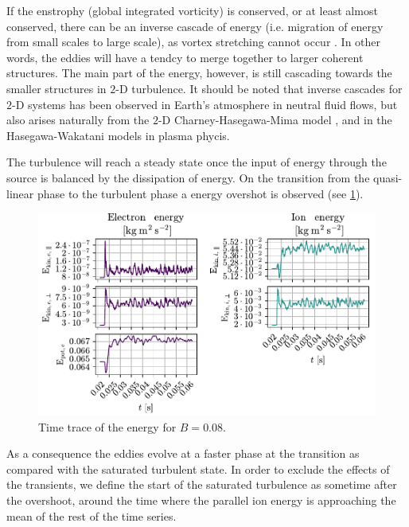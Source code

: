 If the enstrophy (global integrated vorticity) is conserved, or at least almost conserved, there can be an inverse cascade of energy (i.e. migration of energy from small scales to large scale), as vortex stretching cannot occur \cite{Fjortoft1953}.
In other words, the eddies will have a tendcy to merge together to larger coherent structures.
The main part of the energy, however, is still cascading towards the smaller structures in $2$-D turbulence.
It should be noted that inverse cascades for $2$-D systems has been observed in Earth's atmosphere \cite{Smith2002} in neutral fluid flows, but also arises naturally from the $2$-D Charney-Hasegawa-Mima model \cite{Boffetta2002}, and in the Hasegawa-Wakatani \cite{Manz2009} models in plasma phycis.

The turbulence will reach a steady state once the input of energy through the source is balanced by the dissipation of energy.
On the transition from the quasi-linear phase to the turbulent phase a energy overshot is observed (see \cref{fig:energyTrace008}).
%
\begin{figure}[htb]
    \centering
    \includegraphics{fig/results/energyTrace/energyTraceB008}
    \caption{Time trace of the energy for $B=0.08$.}
    \label{fig:energyTrace008}
\end{figure}
%
As a consequence the eddies evolve at a faster phase at the transition as compared with the saturated turbulent state.
In order to exclude the effects of the transients, we define the start of the saturated turbulence as sometime after the overshoot, around the time where the parallel ion energy is approaching the mean of the rest of the time series.

